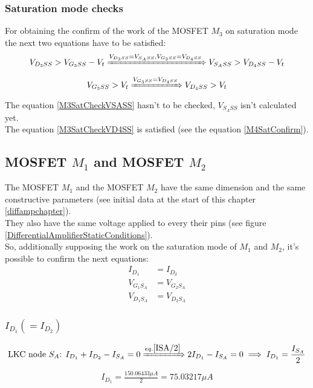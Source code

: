 \documentclass[10pt,a4paper]{book}
\begin{document}
\subsubsection{Saturation mode checks}
For obtaining the confirm of the work of the MOSFET $M_3$ on saturation mode the next two equations have to be satisfied:\\
\begin{align}
V_{{D_3}SS} > V_{{G_3}SS} - V_t \xRightarrow{V_{{D_3}SS} = V_{S_ASS}, V_{{G_3}SS} = V_{{D_4}SS}} V_{{S_A}SS} > V_{{D_4}SS} - V_t \label{M3SatCheckVSASS}
\end{align}
\begin{align}
V_{{G_3}SS} > V_t \xRightarrow{V_{{G_3}SS} = V_{{D_4}SS}} V_{{D_4}SS} > V_t \label{M3SatCheckVD4SS}
\end{align}
The equation \ref{M3SatCheckVSASS} hasn't to be checked, $V_{S_ASS}$ isn't calculated yet.\\
The equation \ref{M3SatCheckVD4SS} is satisfied (see the equation \ref{M4SatConfirm}).\par

\subsection{MOSFET $M_1$ and MOSFET $M_2$}
The MOSFET $M_1$ and the MOSFET $M_2$ have the same dimension and the same constructive parameters (see initial data at the start of this chapter \ref{diffampchapter}).\\
They also have the same voltage applied to every their pins (see figure \ref{DifferentialAmplifierStaticConditions}).\\
So, additionally supposing the work on the saturation mode of $M_1$ and $M_2$, it's possible to confirm the next equations:\\
\begin{align}
I_{D_1} &= I_{D_2}\label{ISA/2}\\
V_{G_1S_A} &= V_{G_2S_A}\\
V_{D_1S_A} &= V_{D_2S_A}
\end{align}

\subsubsection{$I_{D_1} (= I_{D_2})$}
\begin{align}
\text{LKC node } S_A \text{: } I_{D_1} + I_{D_2} - I_{S_A} = 0 \xRightarrow{eq. \ref{ISA/2}} 2I_{D_1} - I_{S_A} = 0 \implies I_{D_1} = \frac{I_{S_A}}{2}
\end{align}
\begin{align}
I_{D_1} = \frac{150.06433 \mu A}{2} = 75.03217 \mu A
\end{align}
\end{document}
